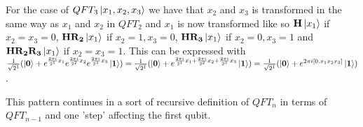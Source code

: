 \vspace{\baselineskip}
\noindent
For the case of $QFT_3\ket{x_1,x_2,x_3}$ we have that $x_2$ and $x_3$ is transformed in the same way as $x_1$ and $x_2$ in $QFT_2$ and $x_1$ is now transformed like so $\mathbf{H}\ket{x_1}$ if $x_2=x_3=0$, $\mathbf{H}\mathbf{R_{2}}\ket{x_1}$ if $x_2=1,x_3=0$, $\mathbf{H}\mathbf{R_{3}}\ket{x_1}$ if $x_2=0,x_3=1$ and $\mathbf{H}\mathbf{R_{2}}\mathbf{R_{3}}\ket{x_1}$ if $x_2=x_3=1$. 
This can be expressed with 
$\frac{1}{\sqrt{2^1}}(\ket{\mathbf{0}}+e^{\frac{2\pi i}{2^1}x_1}e^{\frac{2\pi i}{2^2}x_2}e^{\frac{2\pi i}{2^3}x_3}\ket{\mathbf{1}})= \frac{1}{\sqrt{2^1}}(\ket{\mathbf{0}}+e^{\frac{2\pi i}{2^1}x_1+\frac{2\pi i}{2^2}x_2+\frac{2\pi i}{2^3}x_3}\ket{\mathbf{1}})=\frac{1}{\sqrt{2^1}}(\ket{\mathbf{0}}+e^{2\pi i[0.x_1x_2x_3]}\ket{\mathbf{1}})$.

This pattern continues in a sort of recursive definition of $QFT_n$ in terms of $QFT_{n-1}$ and one 'step' affecting the first qubit. 


